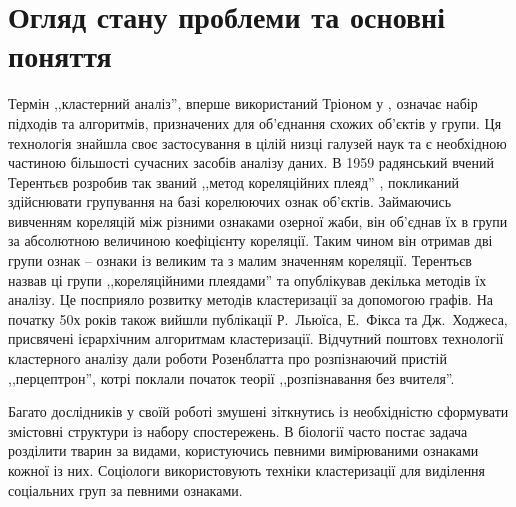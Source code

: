 \chapter{Огляд стану проблеми та основні поняття}\label{ch:01}

Термін ,,кластерний аналіз'', вперше використаний Тріоном у \cite{Tryon:Cluster:1939}, означає набір підходів та алгоритмів, призначених для об'єднання схожих об'єктів у групи. Ця технологія знайшла своє застосування в цілій низці галузей наук та є необхідною частиною більшості сучасних засобів аналізу даних.
В 1959 радянський вчений Терентьєв розробив так званий ,,метод кореляційних плеяд'' \cite{Terentyev}, покликаний здійснювати групування на базі корелюючих ознак об'єктів. Займаючись вивченням кореляцій між різними ознаками озерної жаби, він об'єднав їх в групи за абсолютною величиною коефіцієнту кореляції. Таким чином він отримав дві групи ознак -- ознаки із великим та з малим значенням кореляції. Терентьєв назвав ці групи ,,кореляційними плеядами'' та опублікував декілька методів їх аналізу. Це посприяло розвитку методів кластеризації за допомогою графів. На початку 50х років також вийшли публікації Р.~Льюїса, Е.~Фікса та Дж.~Ходжеса, присвячені ієрархічним алгоритмам кластеризації. Відчутний поштовх технології кластерного аналізу дали роботи Розенблатта про розпізнаючий пристій ,,перцептрон'', котрі поклали початок теорії ,,розпізнавання без вчителя''.


Багато дослідників у своїй роботі змушені зіткнутись із необхідністю сформувати змістовні структури із набору спостережень. В біології часто постає задача розділити тварин за видами, користуючись певними вимірюваними ознаками кожної із них. Соціологи використовують техніки кластеризації для виділення соціальних груп за певними ознаками. 

